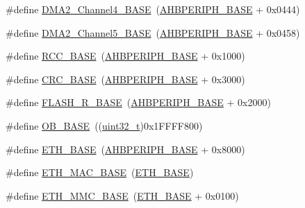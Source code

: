 \begin{DoxyCompactItemize}
\#define \hyperlink{group___peripheral__memory__map_ga01b063266473f290a55047654fbbfbee}{D\+M\+A2\+\_\+\+Channel4\+\_\+\+B\+A\+SE}~(\hyperlink{openmotestm_2library_2inc_2stm32f10x__map_8h_a92eb5d49730765d2abd0f5b09548f9f5}{A\+H\+B\+P\+E\+R\+I\+P\+H\+\_\+\+B\+A\+SE} + 0x0444)
\item 
\#define \hyperlink{group___peripheral__memory__map_ga1eea983a5d68bf36f4d19fbb07955ca1}{D\+M\+A2\+\_\+\+Channel5\+\_\+\+B\+A\+SE}~(\hyperlink{openmotestm_2library_2inc_2stm32f10x__map_8h_a92eb5d49730765d2abd0f5b09548f9f5}{A\+H\+B\+P\+E\+R\+I\+P\+H\+\_\+\+B\+A\+SE} + 0x0458)
\item 
\#define \hyperlink{group___peripheral__memory__map_ga0e681b03f364532055d88f63fec0d99d}{R\+C\+C\+\_\+\+B\+A\+SE}~(\hyperlink{openmotestm_2library_2inc_2stm32f10x__map_8h_a92eb5d49730765d2abd0f5b09548f9f5}{A\+H\+B\+P\+E\+R\+I\+P\+H\+\_\+\+B\+A\+SE} + 0x1000)
\item 
\#define \hyperlink{group___peripheral__memory__map_ga656a447589e785594cbf2f45c835ad7e}{C\+R\+C\+\_\+\+B\+A\+SE}~(\hyperlink{openmotestm_2library_2inc_2stm32f10x__map_8h_a92eb5d49730765d2abd0f5b09548f9f5}{A\+H\+B\+P\+E\+R\+I\+P\+H\+\_\+\+B\+A\+SE} + 0x3000)
\item 
\#define \hyperlink{group___peripheral__memory__map_ga8e21f4845015730c5731763169ec0e9b}{F\+L\+A\+S\+H\+\_\+\+R\+\_\+\+B\+A\+SE}~(\hyperlink{openmotestm_2library_2inc_2stm32f10x__map_8h_a92eb5d49730765d2abd0f5b09548f9f5}{A\+H\+B\+P\+E\+R\+I\+P\+H\+\_\+\+B\+A\+SE} + 0x2000)
\item 
\#define \hyperlink{group___peripheral__memory__map_gab5b5fb155f9ee15dfb6d757da1adc926}{O\+B\+\_\+\+B\+A\+SE}~((\hyperlink{_p_e___types_8h_a33594304e786b158f3fb30289278f5af}{uint32\+\_\+t})0x1\+F\+F\+F\+F800)
\item 
\#define \hyperlink{group___peripheral__memory__map_gad965a7b1106ece575ed3da10c45c65cc}{E\+T\+H\+\_\+\+B\+A\+SE}~(\hyperlink{openmotestm_2library_2inc_2stm32f10x__map_8h_a92eb5d49730765d2abd0f5b09548f9f5}{A\+H\+B\+P\+E\+R\+I\+P\+H\+\_\+\+B\+A\+SE} + 0x8000)
\item 
\#define \hyperlink{group___peripheral__memory__map_ga3cf7005808feb61bff1fee01e50a711a}{E\+T\+H\+\_\+\+M\+A\+C\+\_\+\+B\+A\+SE}~(\hyperlink{group___peripheral__memory__map_gad965a7b1106ece575ed3da10c45c65cc}{E\+T\+H\+\_\+\+B\+A\+SE})
\item 
\#define \hyperlink{group___peripheral__memory__map_ga4946f2b3b03f7998343ac1778fbcf725}{E\+T\+H\+\_\+\+M\+M\+C\+\_\+\+B\+A\+SE}~(\hyperlink{group___peripheral__memory__map_gad965a7b1106ece575ed3da10c45c65cc}{E\+T\+H\+\_\+\+B\+A\+SE} + 0x0100)

\end{DoxyCompactItemize}
